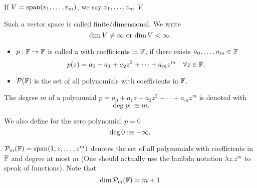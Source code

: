 \begin{mydef} 
  If $V=\operatorname{span} (v_1, \dots, v_m)$, we say $v_1, \dots, v_m$  $V$.
\end{mydef}

\setcounter{thm}{8}
\begin{mydef} 
  Such a vector space is called finite\-/dimensional. We write
  \begin{equation}
    \dim V \neq \infty$ or $\dim V < \infty.
  \end{equation}
\end{mydef}


\begin{mydef}
  \phantom{.}
  \begin{itemize}
    \item $p: \mathbb{F} \to \mathbb{F}$ is called a  with coefficients in $\mathbb{F}$, if there exists $a_0, \ldots, a_m \in \mathbb{F}$ \st
    \begin{equation}
      p(z)=a_0 + a_1 + a_2z^2 + \cdots + a_m z^m \quad \forall z \in \mathbb{F}.
    \end{equation}
    \item $\mathcal{P} (\mathbb{F})$ is the set of all polynomials with coefficients in $\mathbb{F}$.
  \end{itemize}
\end{mydef}

\begin{mydef}
  The degree $m$ of a polynomial $p=a_0+a_1z+a_2z^2+\cdots+a_mz^m$ is denoted with \begin{equation}
    \deg p :\equiv m.
  \end{equation}

  We also define for the zero polynomial $p=0$
  \begin{equation}
    {\operatorname{deg} \,} 0 : \equiv -\infty.
  \end{equation}
\end{mydef}

\begin{mydef}
  $\mathcal{P}_m (\mathbb{F} )=\operatorname{span} (1,z,\dots,z^m)$ denotes the set of all polynomials with coefficients in $\mathbb{F}$ and degree at most $m$ (One should actually use the lambda notation $\lambda z.z^m$ to speak of functions). Note that
  \begin{equation}
    \dim \mathcal{P}_m(\mathbb{F}) = m+1
  \end{equation}
\end{mydef}

